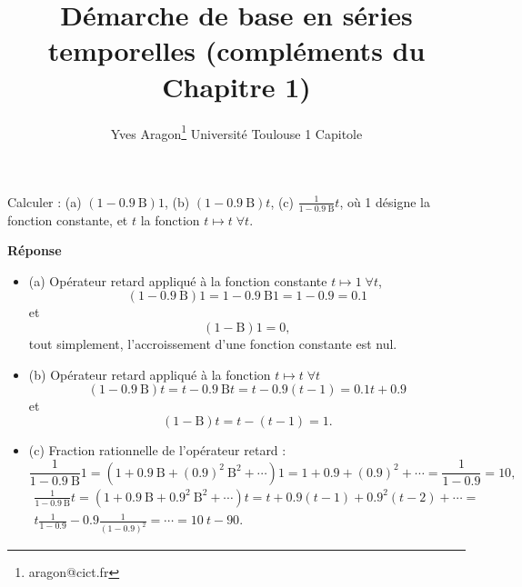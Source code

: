 \documentclass{article}
\title{D\'emarche de base en s\'eries temporelles (compl\'ements du Chapitre 1)}
\author{Yves Aragon\footnote{aragon@cict.fr} \cr
{\normalsize Universit\'e Toulouse 1 Capitole} }
\renewcommand{\thefootnote}{\fnsymbol{footnote}}
\def\bm{\mbox{B}}
\begin{document}
\maketitle
\setcounter{section}{1}
\renewcommand{\thefootnote}{\arabic{footnote}}




%
%

%











\begin{Exercice}
Calculer : (a) $(1 - 0.9\: \bm)1$,  (b) $(1 - 0.9\: \bm)t$, (c) $\frac{1}{1 - 0.9 \:\bm} t$, o\`u 1 d\'esigne la fonction constante, et $t$ la fonction  $ t \mapsto t \;\forall t$.
\end{Exercice}

\textbf{R\'eponse}
\begin{itemize}
\item
(a) Op\'erateur retard appliqu\'e \`a  la fonction constante $t  \mapsto 1 \;\forall t$,
\[(1 - 0.9\: \bm)1 = 1 - 0.9 \:\bm 1 = 1 - 0.9 = 0.1\]
et
\[
(1 - \bm) 1 = 0,
\]
tout simplement, l'accroissement d'une fonction constante est nul.
\item 
(b) Op\'erateur retard appliqu\'e \`a  la fonction $ t \mapsto t \;\forall t$
\[(1 - 0.9\: \bm)t = t - 0.9\: \bm t = t - 0.9 (t-1) = 0.1 t +0.9\]
et
\[
(1 - \bm) t = t - (t-1) = 1.
\]
\item (c) Fraction rationnelle de l'op\'erateur retard :
\[
\frac{1}{1 - 0.9\: \bm} 1 = (1 +  0.9 \:\bm  +  (0.9)^2 \:\bm^2   +\cdots)1  = 1+ 0.9 + (0.9)^2+ \cdots = \frac{1}{1 - 0.9} = 10,
\]
\begin{multline}
\frac{1}{1 - 0.9\: \bm} t = (1 +  0.9 \:\bm  +  0.9^2 \:\bm^2   +\cdots ) t = t+ 0.9 (t-1) + 0.9^2 (t-2) + \cdots = \\
t \frac{1}{1 - 0.9} -0.9 \frac{1}{(1-0.9)^2} = \cdots=10\: t - 90.
\end{multline}
\end{itemize}
\end{document}
